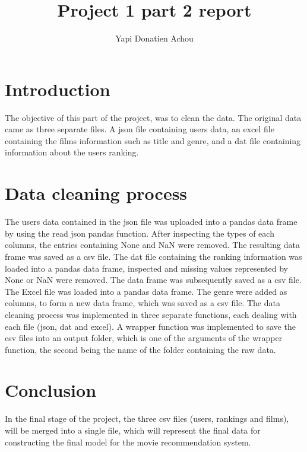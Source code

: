 \documentclass[14pt,a4paper,twoside]{extarticle}
\title{Project 1 part 2 report}
\author{Yapi Donatien Achou}
\begin{document}
\maketitle

\section{Introduction}
The objective of this part of the project, was to clean the data. The original data came as three separate files. A json file containing users data, an excel file containing the films information such as title and genre, and a dat file containing information about the users ranking. 

\section{Data cleaning process}
The users data contained in the json file was uploaded into a pandas data frame by using the read json pandas function. After inspecting the types of each columns, the entries containing None and NaN were removed. The resulting data frame was saved as a csv file.
\justify  
The dat file containing the ranking information was loaded into a pandas data frame, inspected and missing values represented by None or NaN were removed. The data frame was subsequently saved as a csv file.
\justify 
The Excel file was loaded into a pandas data frame. The genre were added as columns, to form a new data frame, which was saved as a csv file.
\justify
The data cleaning process was implemented in three separate functions, each dealing with each file (json, dat and excel). A wrapper function was implemented to save the csv files into an output folder, which is one of the arguments of the wrapper function, the second being the name of the folder containing the raw data.

\section{Conclusion}
In the final stage of the project, the three csv files (users, rankings and films), will be merged into a single file, which will represent the final data for constructing the final model for the movie recommendation system.
\end{document}
